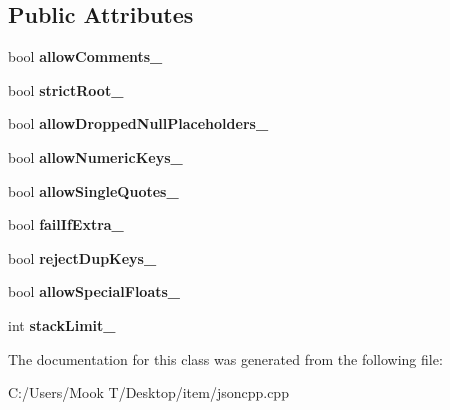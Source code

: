 \subsection*{Public Attributes}
\begin{DoxyCompactItemize}
\item 
\hypertarget{class_json_1_1_our_features_ac71bb7ba7363d3b05ed76602b036ce33}{}bool {\bfseries allow\+Comments\+\_\+}\label{class_json_1_1_our_features_ac71bb7ba7363d3b05ed76602b036ce33}

\item 
\hypertarget{class_json_1_1_our_features_a2095f66a776c0a4ae6cc931a0c94242e}{}bool {\bfseries strict\+Root\+\_\+}\label{class_json_1_1_our_features_a2095f66a776c0a4ae6cc931a0c94242e}

\item 
\hypertarget{class_json_1_1_our_features_a13963bc44bf948eec1968f7ff8e8f5f1}{}bool {\bfseries allow\+Dropped\+Null\+Placeholders\+\_\+}\label{class_json_1_1_our_features_a13963bc44bf948eec1968f7ff8e8f5f1}

\item 
\hypertarget{class_json_1_1_our_features_af6973fc7e774ce2d634ba99442aeb91a}{}bool {\bfseries allow\+Numeric\+Keys\+\_\+}\label{class_json_1_1_our_features_af6973fc7e774ce2d634ba99442aeb91a}

\item 
\hypertarget{class_json_1_1_our_features_abbd6c196d7a22e2a360a59887eda4610}{}bool {\bfseries allow\+Single\+Quotes\+\_\+}\label{class_json_1_1_our_features_abbd6c196d7a22e2a360a59887eda4610}

\item 
\hypertarget{class_json_1_1_our_features_ae8ad25b90706c78f1a8fe929191ac61b}{}bool {\bfseries fail\+If\+Extra\+\_\+}\label{class_json_1_1_our_features_ae8ad25b90706c78f1a8fe929191ac61b}

\item 
\hypertarget{class_json_1_1_our_features_a39b8e0b86b1c24a45e800c023bb715aa}{}bool {\bfseries reject\+Dup\+Keys\+\_\+}\label{class_json_1_1_our_features_a39b8e0b86b1c24a45e800c023bb715aa}

\item 
\hypertarget{class_json_1_1_our_features_af760f91cc2a7af37e44f78fb466061bb}{}bool {\bfseries allow\+Special\+Floats\+\_\+}\label{class_json_1_1_our_features_af760f91cc2a7af37e44f78fb466061bb}

\item 
\hypertarget{class_json_1_1_our_features_a9a786713902d14be6d57a08cc03ccfff}{}int {\bfseries stack\+Limit\+\_\+}\label{class_json_1_1_our_features_a9a786713902d14be6d57a08cc03ccfff}

\end{DoxyCompactItemize}


The documentation for this class was generated from the following file\+:\begin{DoxyCompactItemize}
\item 
C\+:/\+Users/\+Mook T/\+Desktop/item/jsoncpp.\+cpp\end{DoxyCompactItemize}
